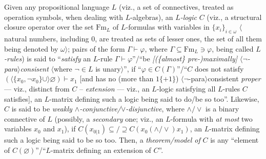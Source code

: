 \documentclass[bsl,meeting]{asl}
\newcommand{\NP}{}
\newcommand{\FA}{\mathfrak{Fm}}
\newcommand{\Fm}{\mathrm{Fm}}
\newcommand{\img}{\mathrm{img}}
\begin{document}
\thispagestyle{empty}


\NP
{}



Given any propositional language $L$
(viz., a set of connectives,
treated as operation symbols, when dealing
with $L$-algebras),
an {\em $L$-logic\/} $C$ %
(viz., a structural %
closure operator over the set $\Fm_L$
of $L$-formulas
with variables in %
$\{x_i\}_{i\in\omega}$
$\langle$natural numbers, including $0$,
are treated as sets of lesser ones,
the set of all them being denoted by $\omega\rangle$;
pairs of the form $\Gamma\vdash\varphi$, where
$\Gamma\subseteq\Fm_L\ni\varphi$,
being called {\em $L$-rules\/})
is said to ``{\em satisfy\/} an $L$-rule $\Gamma\vdash\varphi$''/``be
{\em [(\/\{almost\/\} pre-)maximally]\/
$\langle\neg$-para\/$\rangle$consisent\/}
$\langle$whe\-re $\neg\in L$ is unary$\rangle$'',
if ``$\varphi\in C(\Gamma)$''/``$C$ does not satisfy
$(\langle\{x_0,\neg x_0\}\cup\rangle\varnothing)\vdash x_1$ [and has no (more than $1\{+1\}$)
$\langle\neg$-para$\rangle$consistent
{\em proper\/} --- viz., distinct from $C$ --
{\em extension\/} --- viz., an $L$-logic satisfying all $L$-rules
$C$ satisfies],
an $L$-matrix defining such a logic being said to do/be so too''.
Likewise, $C$ is said to be {\em weakly\/
$\land$-conjunctive/\/$\lor$-disjunctive},
where $\land/\lor$ is a binary connective of
$L$ (possibly, a {\em secondary\/} one; viz.,
an $L$-formula with {\em at most\/} two variables $x_0$ and $x_1$),
if $C(x_{0|1})\subseteq/\supseteq C(x_0(\land/\lor)x_1)$,
an $L$-matrix defining such a logic being said to be so too.
Then, a {\em theorem/model of\/} $C$ is any
``element of $C(\varnothing)$''/``$L$-matrix defining an
extension of $C$''.
\end{document}
